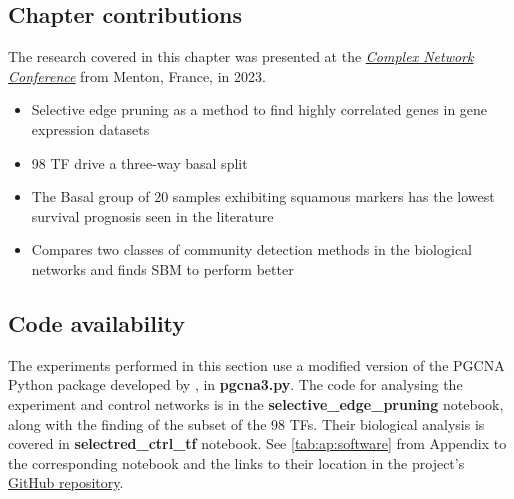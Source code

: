 \subsection{Chapter contributions}

The research covered in this chapter was presented at the \textit{\href{https://2023.complexnetworks.org/}{Complex Network Conference}} from Menton, France, in 2023.

\begin{itemize}
    \item Selective edge pruning as a method to find highly correlated genes in gene expression datasets 
    \item 98 TF drive a three-way basal split
    \item The Basal group of 20 samples exhibiting squamous markers has the lowest survival prognosis seen in the literature
    \item Compares two classes of community detection methods in the biological networks and finds SBM to perform better 
\end{itemize}

\subsection{Code availability}

The experiments performed in this section use a modified version of the PGCNA Python package developed by \citep{Care2019-ij}, in \textbf{pgcna3.py}. The code for analysing the experiment and control networks is in the \textbf{selective\_edge\_pruning} notebook, along with the finding of the subset of the 98 TFs. Their biological analysis is covered in \textbf{selectred\_ctrl\_tf} notebook. See \cref{tab:ap:software} from Appendix to the corresponding notebook and the links to their location in the project's \href{https://github.com/vladUng/PhD_thesis_exp/}{GitHub repository}.


